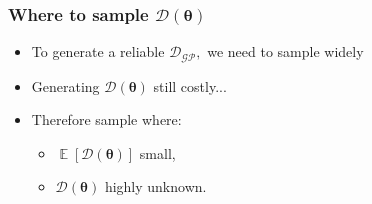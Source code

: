 \documentclass{beamer}
\DeclareMathOperator{\E}{\mathbb{E}}
\begin{document}
\begin{frame}
    \frametitle{Where to sample $\mathcal{D}(\bm{\theta})$}
    \begin{itemize}
        \item To generate a reliable $\mathcal{D}_{\mathcal{GP}},$ we need to
              sample widely
        \item Generating $\mathcal{D}(\bm{\theta})$ still costly...
        \item Therefore sample where:
              \begin{itemize}
                  \item <2-> $\E[\mathcal{D}(\bm{\theta})]$ small,
                  \item <3-> $\mathcal{D}(\bm{\theta})$ highly unknown.
              \end{itemize}
    \end{itemize}
\end{frame}
\end{document}
